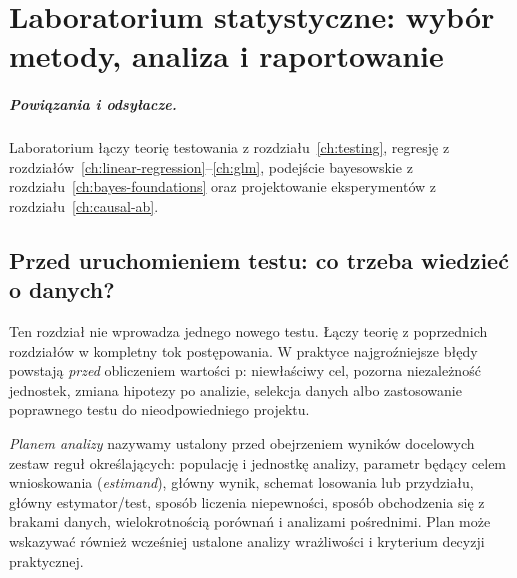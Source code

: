 \chapter{Laboratorium statystyczne: wybór metody, analiza i raportowanie}
\label{ch:stat-laboratory}
\paragraph{Powiązania i odsyłacze.} Laboratorium łączy teorię testowania z rozdziału~\ref{ch:testing}, regresję z rozdziałów~\ref{ch:linear-regression}--\ref{ch:glm}, podejście bayesowskie z rozdziału~\ref{ch:bayes-foundations} oraz projektowanie eksperymentów z rozdziału~\ref{ch:causal-ab}.


\section{Przed uruchomieniem testu: co trzeba wiedzieć o danych?}
Ten rozdział nie wprowadza jednego nowego testu. Łączy teorię z poprzednich rozdziałów w kompletny tok postępowania. W praktyce najgroźniejsze błędy powstają \emph{przed} obliczeniem wartości p: niewłaściwy cel, pozorna niezależność jednostek, zmiana hipotezy po analizie, selekcja danych albo zastosowanie poprawnego testu do nieodpowiedniego projektu.

\begin{definicja}\label{def:stat-analysis-plan}
\emph{Planem analizy} nazywamy ustalony przed obejrzeniem wyników docelowych zestaw reguł określających: populację i jednostkę analizy, parametr będący celem wnioskowania (\emph{estimand}), główny wynik, schemat losowania lub przydziału, główny estymator/test, sposób liczenia niepewności, sposób obchodzenia się z brakami danych, wielokrotnością porównań i analizami pośrednimi. Plan może wskazywać również wcześniej ustalone analizy wrażliwości i kryterium decyzji praktycznej.
\end{definicja}

